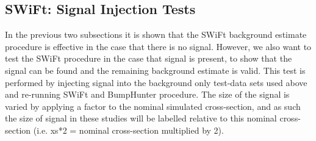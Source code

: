 
\FloatBarrier

\subsection{SWiFt: Signal Injection Tests}
\label{sec:SWiFt_signalInj}


In the previous two subsections it is shown that the SWiFt background estimate procedure is effective in the case that there is no signal.
However, we also want to test the SWiFt procedure in the case that signal is present, to show that the signal can be found and the remaining background estimate is valid.
This test is performed by injecting signal into the background only test-data sets used above and re-running SWiFt and {\sc BumpHunter} procedure.
The size of the signal is varied by applying a factor to the nominal simulated cross-section,
and as such the size of signal in these studies will be labelled relative to this nominal cross-section (i.e. xs*2 = nominal cross-section multiplied by 2).


